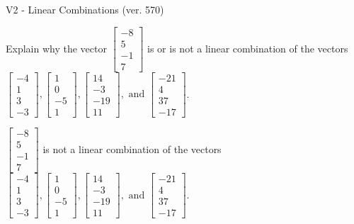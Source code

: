 \begin{exercise}
  \begin{exerciseTitle}V2 - Linear Combinations (ver. 570)\end{exerciseTitle}
  \begin{exerciseStatement}
    Explain why the vector \(\left[\begin{array}{c}
-8 \\
5 \\
-1 \\
7
\end{array}\right]\)  is or is not a linear 
	combination of the vectors \(\left[\begin{array}{c}
-4 \\
1 \\
3 \\
-3
\end{array}\right] , \left[\begin{array}{c}
1 \\
0 \\
-5 \\
1
\end{array}\right] , \left[\begin{array}{c}
14 \\
-3 \\
-19 \\
11
\end{array}\right] , \text{ and } \left[\begin{array}{c}
-21 \\
4 \\
37 \\
-17
\end{array}\right]\).
	


  \end{exerciseStatement}
  \begin{exerciseAnswer}
   \(\left[\begin{array}{c}
-8 \\
5 \\
-1 \\
7
\end{array}\right]\) 
  	 is not  
	a linear combination of the vectors \(\left[\begin{array}{c}
-4 \\
1 \\
3 \\
-3
\end{array}\right] , \left[\begin{array}{c}
1 \\
0 \\
-5 \\
1
\end{array}\right] , \left[\begin{array}{c}
14 \\
-3 \\
-19 \\
11
\end{array}\right] , \text{ and } \left[\begin{array}{c}
-21 \\
4 \\
37 \\
-17
\end{array}\right]\).


\end{exerciseAnswer}
\end{exercise}
